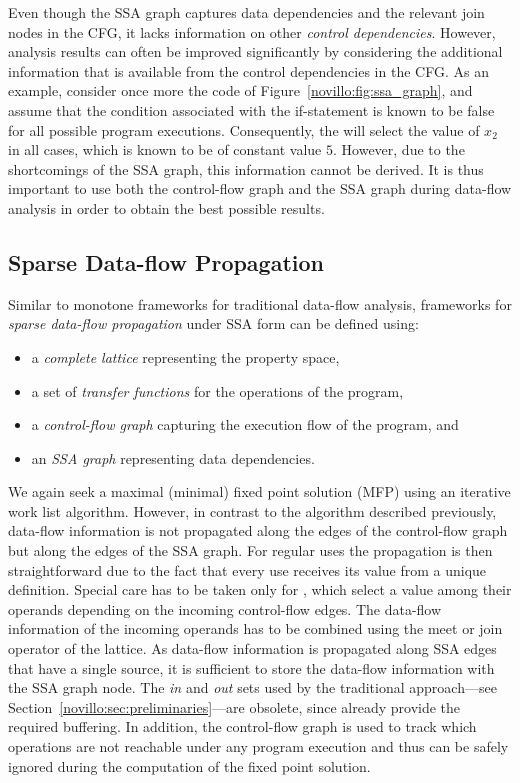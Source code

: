Even though the SSA graph captures data dependencies and the relevant join nodes in the CFG, it lacks information on other \emph{control dependencies}. 
However, analysis results can often be improved significantly by considering the additional information that is available from the control dependencies in the CFG. 
As an example, consider once more the code of Figure~\ref{novillo:fig:ssa_graph}, and assume that the condition associated with the if-statement is known to be false for all possible program executions. 
Consequently, the \phifun will select the value of $x_2$ in all cases, which is known to be of constant value $5$. 
However, due to the shortcomings of the SSA graph, this information cannot be derived. 
It is thus important to use both the control-flow graph and the SSA graph during data-flow analysis in order to obtain the best possible results.

\subsection{Sparse Data-flow Propagation}

Similar to monotone frameworks for traditional data-flow analysis, frameworks for \emph{sparse data-flow propagation} under SSA form can be defined using:
\begin{itemize}
  \item a \emph{complete lattice} representing the property space,
  \item a set of \emph{transfer functions} for the operations of the program,
  \item a \emph{control-flow graph} capturing the execution flow of the program, and
  \item an \emph{SSA graph} representing data dependencies.
\end{itemize}
We again seek a maximal (minimal) fixed point solution (MFP) using an iterative work list algorithm. 
However, in contrast to the algorithm described previously, data-flow information is not propagated along the edges of the control-flow graph but along the edges of the SSA graph. 
For regular uses the propagation is then straightforward due to the fact that every use receives its value from a unique definition. 
Special care has to be taken only for \phifuns, which select a value among their operands depending on the incoming control-flow edges. 
The data-flow information of the incoming operands has to be combined using the meet or join operator of the lattice. 
As data-flow information is propagated along SSA edges that have a single source, it is sufficient to store the data-flow information with the SSA graph node. 
The \emph{in} and \emph{out} sets used by the traditional approach---see Section~\ref{novillo:sec:preliminaries}---are obsolete, since \phifuns already provide the required buffering.
In addition, the control-flow graph is used to track which operations are not reachable under any program execution and thus can be safely ignored during the computation of the fixed point solution.
\medskip

